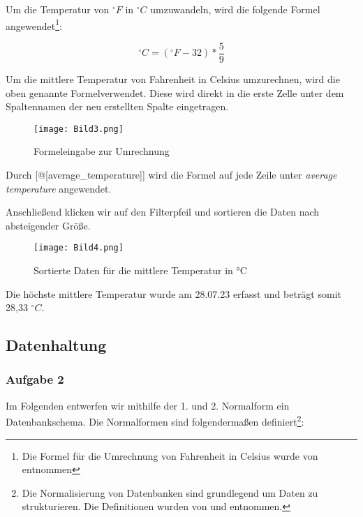 \documentclass[a4paper, 12pt]{article}
\begin{document}
Um die Temperatur von \(^\circ F\) in \(^\circ C\) umzuwandeln, wird die folgende Formel angewendet\footnote{Die Formel für die Umrechnung von Fahrenheit in Celsius wurde von \cite{2} entnommen}:

\begin{equation}
   ^\circ C = (^\circ F -32 )*\frac{5}{9} \label{Grad}
\end{equation}

\vspace{\baselineskip}

Um die mittlere Temperatur von Fahrenheit in Celsius umzurechnen, wird die oben genannte Formelverwendet. Diese wird direkt in die erste Zelle unter dem Spaltennamen der neu erstellten Spalte eingetragen.

\vspace{\baselineskip}

\begin{figure}[ht]
    \centering
    \texttt{[image: Bild3.png]}
    \par Formeleingabe zur Umrechnung
\end{figure}

\vspace{\baselineskip}

Durch [@[average\_temperature]] wird die Formel auf jede Zeile unter \textit{average temperature} angewendet.

Anschließend klicken wir auf den Filterpfeil und sortieren die Daten nach absteigender Größe.

\vspace{\baselineskip}

\begin{figure}[ht]
    \centering
    \texttt{[image: Bild4.png]}
    \par Sortierte Daten für die mittlere Temperatur in °C
\end{figure}

\vspace{\baselineskip}

Die höchste mittlere Temperatur wurde am 28.07.23 erfasst und beträgt somit 28,33 \(^\circ C\).

\newpage
\subsection{Datenhaltung}

\subsubsection{Aufgabe 2}
Im Folgenden entwerfen wir mithilfe der 1. und 2. Normalform ein Datenbankschema. Die Normalformen sind folgendermaßen definiert\footnote{Die Normalisierung von Datenbanken sind grundlegend um Daten zu strukturieren. Die Definitionen wurden von \cite{4} und \cite{5} entnommen.}:
\end{document}
